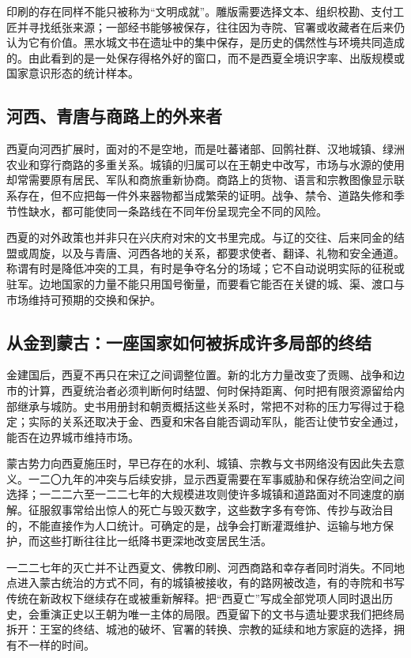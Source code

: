 印刷的存在同样不能只被称为“文明成就”。雕版需要选择文本、组织校勘、支付工匠并寻找纸张来源；一部经书能够被保存，往往因为寺院、官署或收藏者在后来仍认为它有价值。黑水城文书在遗址中的集中保存，是历史的偶然性与环境共同造成的。由此看到的是一处保存得格外好的窗口，而不是西夏全境识字率、出版规模或国家意识形态的统计样本。

\subsection{河西、青唐与商路上的外来者}

西夏向河西扩展时，面对的不是空地，而是吐蕃诸部、回鹘社群、汉地城镇、绿洲农业和穿行商路的多重关系。城镇的归属可以在王朝史中改写，市场与水源的使用却常需要原有居民、军队和商旅重新协商。商路上的货物、语言和宗教图像显示联系存在，但不应把每一件外来器物都当成繁荣的证明。战争、禁令、道路失修和季节性缺水，都可能使同一条路线在不同年份呈现完全不同的风险。

西夏的对外政策也并非只在兴庆府对宋的文书里完成。与辽的交往、后来同金的结盟或周旋，以及与青唐、河西各地的关系，都要求使者、翻译、礼物和安全通道。称谓有时是降低冲突的工具，有时是争夺名分的场域；它不自动说明实际的征税或驻军。边地国家的力量不能只用国号衡量，而要看它能否在关键的城、渠、渡口与市场维持可预期的交换和保护。

\subsection{从金到蒙古：一座国家如何被拆成许多局部的终结}

金建国后，西夏不再只在宋辽之间调整位置。新的北方力量改变了贡赐、战争和边市的计算，西夏统治者必须判断何时结盟、何时保持距离、何时把有限资源留给内部继承与城防。史书用册封和朝贡概括这些关系时，常把不对称的压力写得过于稳定；实际的关系还取决于金、西夏和宋各自能否调动军队，能否让使节安全通过，能否在边界城市维持市场。

蒙古势力向西夏施压时，早已存在的水利、城镇、宗教与文书网络没有因此失去意义。一二〇九年的冲突与后续安排，显示西夏需要在军事威胁和保存统治空间之间选择；一二二六至一二二七年的大规模进攻则使许多城镇和道路面对不同速度的崩解。征服叙事常给出惊人的死亡与毁灭数字，这些数字多有夸饰、传抄与政治目的，不能直接作为人口统计。可确定的是，战争会打断灌溉维护、运输与地方保护，而这些打断往往比一纸降书更深地改变居民生活。

一二二七年的灭亡并不让西夏文、佛教印刷、河西商路和幸存者同时消失。不同地点进入蒙古统治的方式不同，有的城镇被接收，有的路网被改造，有的寺院和书写传统在新政权下继续存在或被重新解释。把“西夏亡”写成全部党项人同时退出历史，会重演正史以王朝为唯一主体的局限。西夏留下的文书与遗址要求我们把终局拆开：王室的终结、城池的破坏、官署的转换、宗教的延续和地方家庭的选择，拥有不一样的时间。


